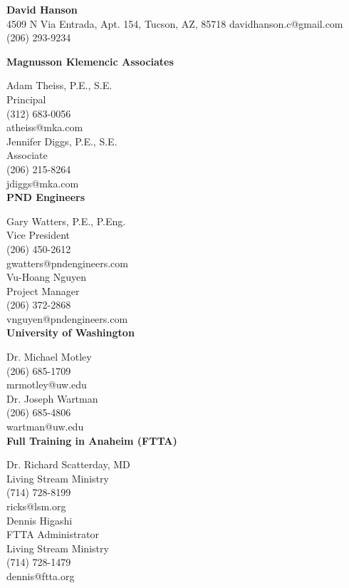 \documentclass[letterpaper,6pt]{article}
\begin{document}
\begin{center}
{\Large \textbf{David Hanson}} \\
4509 N Via Entrada, Apt. 154, Tucson, AZ, 85718 \textbar{} davidhanson.c@gmail.com \textbar{} (206) 293-9234
\end{center}

\begin{multicols}{2}
\vspace{5mm}
\textbf{Magnusson Klemencic Associates}
\vspace{2mm}

Adam Theiss, P.E., S.E. \\
Principal \\
(312) 683-0056 \\
atheiss@mka.com \\ 

Jennifer Diggs, P.E., S.E. \\
Associate \\
(206) 215-8264 \\
jdiggs@mka.com \\ 

\vspace{5mm}
    \textbf{PND Engineers}
\vspace{2mm}

Gary Watters, P.E., P.Eng. \\
Vice President \\
(206) 450-2612 \\
gwatters@pndengineers.com \\ 

Vu-Hoang Nguyen \\
Project Manager \\
(206) 372-2868 \\
vnguyen@pndengineers.com \\ 

\vspace{5mm}
    \textbf{University of Washington}
\vspace{2mm}

Dr. Michael Motley \\
(206) 685-1709 \\
mrmotley@uw.edu \\

Dr. Joseph Wartman\\
(206) 685-4806 \\
wartman@uw.edu \\

\vspace{5mm}
    \textbf{Full Training in Anaheim (FTTA)}
\vspace{2mm}

Dr. Richard Scatterday, MD \\
Living Stream Ministry \\
(714) 728-8199 \\
ricks@lsm.org \\

Dennis Higashi \\
FTTA Administrator \\
Living Stream Ministry \\
(714) 728-1479 \\
dennis@ftta.org 

\end{multicols}
\end{document}
